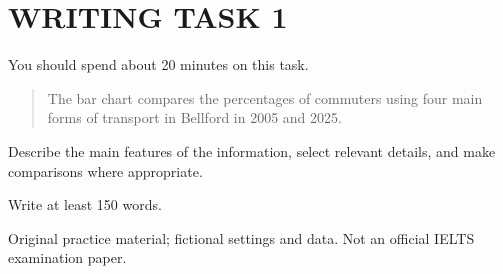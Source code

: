 \section*{WRITING TASK 1}
You should spend about 20 minutes on this task.

\begin{quote}\large The bar chart compares the percentages of commuters using four main forms of transport in Bellford in 2005 and 2025.
\end{quote}
Describe the main features of the information, select relevant details, and make comparisons where appropriate.

\begin{center}
\end{center}
Write at least 150 words.
\par\bigskip
{\footnotesize\color{gray} Original practice material; fictional settings and data. Not an official IELTS examination paper.}
